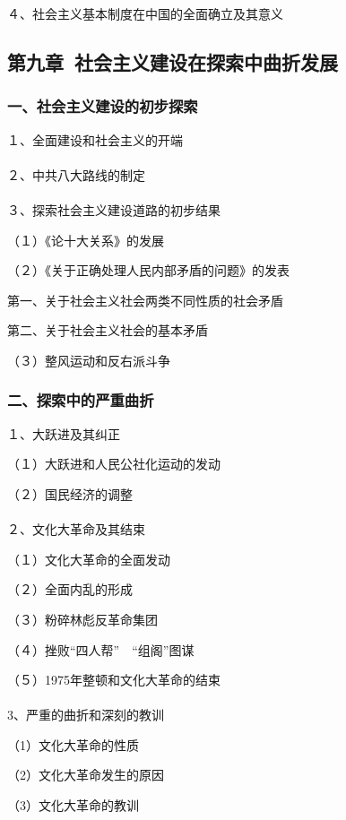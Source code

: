 \documentclass{ctexart}
\begin{document}
４、社会主义基本制度在中国的全面确立及其意义



\subsection{第九章\ 社会主义建设在探索中曲折发展}

\subsubsection{一、社会主义建设的初步探索}

１、全面建设和社会主义的开端
\\\\

２、中共八大路线的制定
\\\\

３、探索社会主义建设道路的初步结果

（１）《论十大关系》的发展

（２）《关于正确处理人民内部矛盾的问题》的发表

第一、关于社会主义社会两类不同性质的社会矛盾

第二、关于社会主义社会的基本矛盾

（３）整风运动和反右派斗争

\subsubsection{二、探索中的严重曲折}

１、大跃进及其纠正

（１）大跃进和人民公社化运动的发动

（２）国民经济的调整
\\\\

２、文化大革命及其结束

（１）文化大革命的全面发动

（２）全面内乱的形成

（３）粉碎林彪反革命集团

（４）挫败“四人帮”　“组阁”图谋

（５）1975年整顿和文化大革命的结束
\\\\

3、严重的曲折和深刻的教训

（1）文化大革命的性质

（2）文化大革命发生的原因

（3）文化大革命的教训
\end{document}
